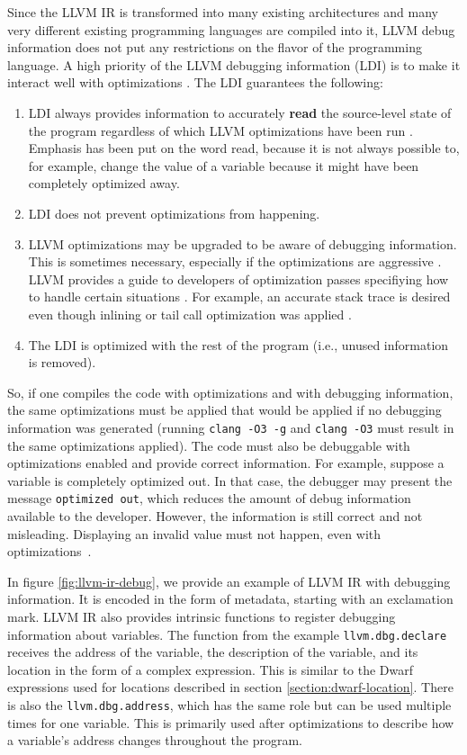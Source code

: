 Since the LLVM IR is transformed into many existing architectures and many very
different existing programming languages are compiled into it, LLVM debug
information does not put any restrictions on the flavor of the programming
language. A high priority of the LLVM debugging information (LDI) is to make it
interact well with optimizations \cite{llvm-debug-info}. The LDI guarantees the
following:
\begin{enumerate}
    \item LDI always provides information to accurately \textbf{read} the
        source-level state of the program regardless of which LLVM
        optimizations have been run \cite{llvm-debug-info}. Emphasis has been
        put on the word read, because it is not always possible to, for
        example, change the value of a variable because it might have been
        completely optimized away.
    \item LDI does not prevent optimizations from happening.
    \item LLVM optimizations may be upgraded to be aware of debugging
        information. This is sometimes necessary, especially if the
        optimizations are aggressive \cite{llvm-debug-info}. LLVM provides a
        guide to developers of optimization passes specifiying how to handle
        certain situations \cite{llvm-debug-optimizations}. For example,
        an accurate stack trace is desired even though inlining or tail call
        optimization was applied \cite{llvm-debug-info}.
    \item The LDI is optimized with the rest of the program (i.e., unused
        information is removed).
\end{enumerate}
So, if one compiles the code with optimizations and with debugging information,
the same optimizations must be applied that would be applied if no debugging
information was generated (running \texttt{clang -O3 -g} and \texttt{clang -O3}
must result in the same optimizations applied). The code must also be
debuggable with optimizations enabled and provide correct information. For
example, suppose a variable is completely optimized out. In that case, the
debugger may present the message \texttt{optimized out}, which reduces the
amount of debug information available to the developer. However, the
information is still correct and not misleading. Displaying an invalid value
must not happen, even with optimizations~\cite{llvm-debug-info}.

In figure \ref{fig:llvm-ir-debug}, we provide an example of LLVM IR with
debugging information. It is encoded in the form of metadata, starting with an
exclamation mark. LLVM IR also provides intrinsic functions to register
debugging information about variables. The function from the example
\texttt{llvm.dbg.declare} receives the address of the variable, the description
of the variable, and its location in the form of a complex expression. This is
similar to the Dwarf expressions used for locations described in section
\ref{section:dwarf-location}. There is also the \texttt{llvm.dbg.address},
which has the same role but can be used multiple times for one variable. This
is primarily used after optimizations to describe how a variable's address
changes throughout the program.

